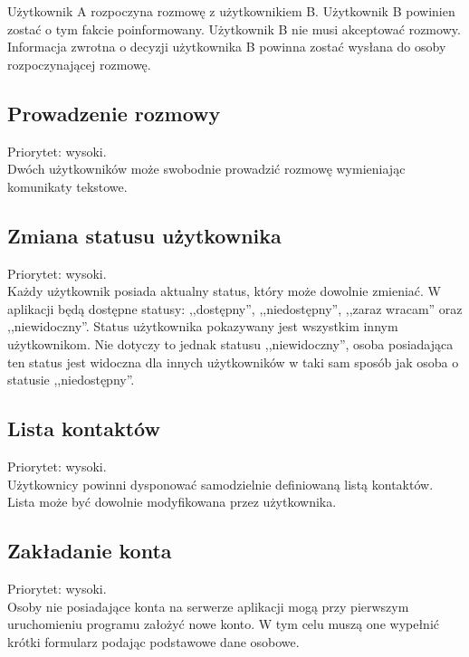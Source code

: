 \documentclass[a4paper,12pt]{article}
\begin{document}
Użytkownik A rozpoczyna rozmowę z użytkownikiem B. Użytkownik B powinien zostać o tym fakcie poinformowany. Użytkownik B nie musi akceptować rozmowy. Informacja zwrotna o decyzji użytkownika B powinna zostać wysłana do osoby rozpoczynającej rozmowę.

\subsection[Prowadzenie rozmowy]{Prowadzenie rozmowy}

Priorytet: wysoki.\\

Dwóch użytkowników może swobodnie prowadzić rozmowę wymieniając komunikaty tekstowe.

\subsection[Zmiana statusu użytkownika]{Zmiana statusu użytkownika}

Priorytet: wysoki.\\

Każdy użytkownik posiada aktualny status, który może dowolnie zmieniać. W aplikacji będą dostępne statusy: ,,dostępny'', ,,niedostępny'', ,,zaraz wracam'' oraz ,,niewidoczny''. Status użytkownika pokazywany jest wszystkim innym użytkownikom. Nie dotyczy to jednak statusu ,,niewidoczny'', osoba posiadająca ten status jest widoczna dla innych użytkowników w taki sam sposób jak osoba o statusie ,,niedostępny''.

\subsection[Lista kontaktów]{Lista kontaktów}

Priorytet: wysoki.\\

Użytkownicy powinni dysponować samodzielnie definiowaną listą kontaktów. Lista może być dowolnie modyfikowana przez użytkownika.

\subsection[Zakładanie konta]{Zakładanie konta}

Priorytet: wysoki.\\

Osoby nie posiadające konta na serwerze aplikacji mogą przy pierwszym uruchomieniu programu założyć nowe konto. W tym celu muszą one wypełnić krótki formularz podając podstawowe dane osobowe.
\end{document}
